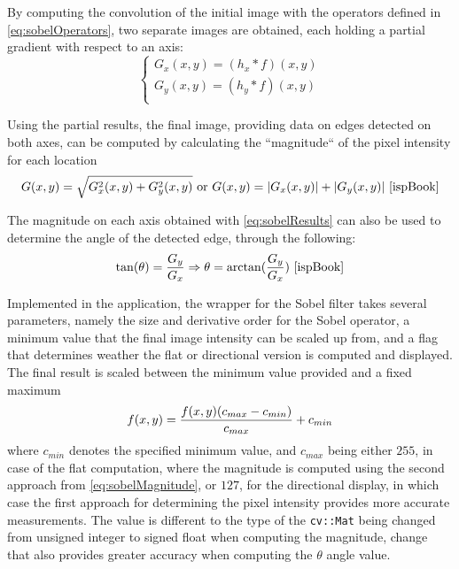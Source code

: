 By computing the convolution of the initial image with the operators defined in \cref{eq:sobelOperators},
two separate images are obtained, each holding a partial gradient with respect to an axis:
\begin{equation}
	\label{eq:sobelResults}
	\begin{cases}
		G_x(x, y) = (h_x * f)(x, y) \\
		G_y(x, y) = (h_y * f)(x, y) \\
	\end{cases}
\end{equation}

Using the partial results, the final image, providing data on edges detected on both axes, can be computed
by calculating the ``magnitude`` of the pixel intensity for each location
\begin{equation}
	\label{eq:sobelMagnitude}
	G(x, y) = \sqrt{G_x^2(x, y) + G_y^2(x, y)}
	\text{ or }
	G(x, y) = |G_x(x, y)| + |G_y(x, y)|
	\text{ \cite{ispBook}}
\end{equation}

The magnitude on each axis obtained with \cref{eq:sobelResults} can also be used to determine the angle
of the detected edge, through the following:
\begin{equation}
	\label{eq:sobelTheta}
	\tan(\theta) = {G_y\over{G_x}} \Rightarrow \theta = \arctan({G_y\over{G_x}})
	\text{ \cite{ispBook}}
\end{equation}

Implemented in the application, the wrapper for the Sobel filter takes several parameters, namely the size
and derivative order for the Sobel operator, a minimum value that the final image intensity can be scaled
up from, and a flag that determines weather the flat or directional version is computed and displayed.
The final result is scaled between the minimum value provided and a fixed maximum
\begin{equation}
	\label{eq:sobelScaling}
	f(x, y) = {f(x, y)(c_{max} - c_{min})\over{c_{max}}} + c_{min}
\end{equation}
where \(c_{min}\) denotes the specified minimum value, and \(c_{max}\) being either \(255\), in case of the flat
computation, where the magnitude is computed using the second approach from \cref{eq:sobelMagnitude}, or \(127\),
for the directional display, in which case the first approach for determining the pixel intensity provides
more accurate measurements. The value is different to the type of the \verb|cv::Mat| being changed from
unsigned integer to signed float when computing the magnitude, change that also provides greater accuracy when
computing the \(\theta\) angle value.


